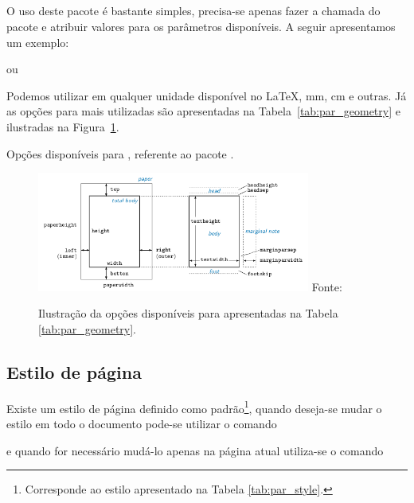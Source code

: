 \subsection{}
O uso deste pacote é bastante simples, precisa-se apenas fazer a chamada do pacote e atribuir valores para os parâmetros disponíveis. A seguir apresentamos um exemplo:
\begin{code}
\usepackage{geometry}
\geometry{parameter = length, ...}
\end{code}
ou
\begin{code}
\usepackage[parameter = length, ...]{geometry}
\end{code}

Podemos utilizar  em qualquer unidade disponível no LaTeX, mm, cm e outras. Já as opções para  mais utilizadas são apresentadas na Tabela~\ref{tab:par_geometry} e ilustradas na Figura~\ref{fig:par_geometry}.
\begin{table}[h!tb]
    \centering
    \caption{Opções disponíveis para , referente ao pacote .}
    \label{tab:par_geometry}
    
\end{table}
\begin{figure}[h!]
    \centering
    \includegraphics[width=0.8\textwidth]{figures/geometry_margin.png}
    \flushright Fonte: \cite{Umeki:2010:Geometry}
    \caption{Ilustração da opções disponíveis para  apresentadas na Tabela \ref{tab:par_geometry}.} \label{fig:par_geometry}
\end{figure}

\subsection{Estilo de p\'{a}gina}

Existe um estilo de página definido como padrão\footnote{Corresponde ao estilo  apresentado na Tabela \ref{tab:par_style}.}, quando deseja-se mudar o estilo em todo o documento pode-se utilizar o comando
\begin{code}
\pagestyle{style}
\end{code}
e quando for necessário mudá-lo apenas na página atual utiliza-se o comando
\begin{code}
\thispagestyle{style}
\end{code}

